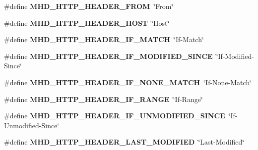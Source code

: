 \begin{DoxyCompactItemize}
\item 
\hypertarget{group__headers_gadfc121a11f36d8ebe5db1d8022b30122}{\#define {\bfseries \-M\-H\-D\-\_\-\-H\-T\-T\-P\-\_\-\-H\-E\-A\-D\-E\-R\-\_\-\-F\-R\-O\-M}~\char`\"{}\-From\char`\"{}}\label{group__headers_gadfc121a11f36d8ebe5db1d8022b30122}

\item 
\hypertarget{group__headers_gaecbaeab1e68266ef57f7d5d1c3bef1ef}{\#define {\bfseries \-M\-H\-D\-\_\-\-H\-T\-T\-P\-\_\-\-H\-E\-A\-D\-E\-R\-\_\-\-H\-O\-S\-T}~\char`\"{}\-Host\char`\"{}}\label{group__headers_gaecbaeab1e68266ef57f7d5d1c3bef1ef}

\item 
\hypertarget{group__headers_ga133d2e2f82e0a880fbf285fa1c69fbcb}{\#define {\bfseries \-M\-H\-D\-\_\-\-H\-T\-T\-P\-\_\-\-H\-E\-A\-D\-E\-R\-\_\-\-I\-F\-\_\-\-M\-A\-T\-C\-H}~\char`\"{}\-If-\/\-Match\char`\"{}}\label{group__headers_ga133d2e2f82e0a880fbf285fa1c69fbcb}

\item 
\hypertarget{group__headers_ga960ee761b18a9e1f61110db6638fbd7f}{\#define {\bfseries \-M\-H\-D\-\_\-\-H\-T\-T\-P\-\_\-\-H\-E\-A\-D\-E\-R\-\_\-\-I\-F\-\_\-\-M\-O\-D\-I\-F\-I\-E\-D\-\_\-\-S\-I\-N\-C\-E}~\char`\"{}\-If-\/\-Modified-\/\-Since\char`\"{}}\label{group__headers_ga960ee761b18a9e1f61110db6638fbd7f}

\item 
\hypertarget{group__headers_ga8e43ec360b115158a040bbddc5bdaf5d}{\#define {\bfseries \-M\-H\-D\-\_\-\-H\-T\-T\-P\-\_\-\-H\-E\-A\-D\-E\-R\-\_\-\-I\-F\-\_\-\-N\-O\-N\-E\-\_\-\-M\-A\-T\-C\-H}~\char`\"{}\-If-\/\-None-\/\-Match\char`\"{}}\label{group__headers_ga8e43ec360b115158a040bbddc5bdaf5d}

\item 
\hypertarget{group__headers_gad90ce434c84e28d836b3226d579f0e6f}{\#define {\bfseries \-M\-H\-D\-\_\-\-H\-T\-T\-P\-\_\-\-H\-E\-A\-D\-E\-R\-\_\-\-I\-F\-\_\-\-R\-A\-N\-G\-E}~\char`\"{}\-If-\/\-Range\char`\"{}}\label{group__headers_gad90ce434c84e28d836b3226d579f0e6f}

\item 
\hypertarget{group__headers_ga24b37356eb907729c2d5c3c42c6aa0cc}{\#define {\bfseries \-M\-H\-D\-\_\-\-H\-T\-T\-P\-\_\-\-H\-E\-A\-D\-E\-R\-\_\-\-I\-F\-\_\-\-U\-N\-M\-O\-D\-I\-F\-I\-E\-D\-\_\-\-S\-I\-N\-C\-E}~\char`\"{}\-If-\/\-Unmodified-\/\-Since\char`\"{}}\label{group__headers_ga24b37356eb907729c2d5c3c42c6aa0cc}

\item 
\hypertarget{group__headers_ga3f6a8a3347039521ca54a32a6721c342}{\#define {\bfseries \-M\-H\-D\-\_\-\-H\-T\-T\-P\-\_\-\-H\-E\-A\-D\-E\-R\-\_\-\-L\-A\-S\-T\-\_\-\-M\-O\-D\-I\-F\-I\-E\-D}~\char`\"{}\-Last-\/\-Modified\char`\"{}}\label{group__headers_ga3f6a8a3347039521ca54a32a6721c342}


\end{DoxyCompactItemize}
